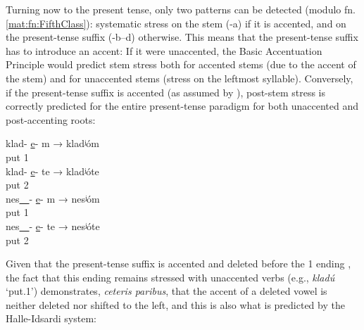 \documentclass[output=paper,colorlinks,citecolor=black,koreanfont]{langscibook}
\begin{document}
\noindent Turning now to the present tense, only two patterns can be detected (modulo fn. \ref{mat:fn:FifthClass}): systematic stress on the stem (-a) if it is accented, and on the present-tense suffix (-b--d) otherwise. This means \citep{Halle1973,Melvold1989} that the present-tense suffix has to introduce an accent: If it were unaccented, the Basic Accentuation Principle  would predict stem stress both for accented stems (due to the accent of the stem) and for unaccented stems (stress on the leftmost syllable). Conversely, if the present-tense suffix is accented (as assumed by \citealt{Melvold1989}), post-stem stress is correctly predicted for the entire present-tense paradigm for both unaccented  and post-accenting  roots:

\ea\label{mat:ex:PostStem-Unaccented}
\ea\gll klad- \ul{e}- m → kladʲóm \\
put {\PRS} {1\PL}\\
\ex\gll klad- \ul{e}- te → kladʲóte \\
put {\PRS} {2\PL}\\
\z
\ex\label{mat:ex:PostStem-Post-Accenting}
\ea\gll nes\ul{~~}- \ul{e}- m → nesʲóm \\
put {\PRS} {1\PL}\\
\ex\gll nes\ul{~~}- \ul{e}- te → nesʲóte \\
put {\PRS} {2\PL}\\
\z
\z

\noindent Given that the present-tense suffix is accented and deleted before the {1\SG} ending , the fact that this ending remains stressed with unaccented verbs (e.g., \textit{kladú} ‘put.{1\SG}’) demonstrates, \textit{ceteris paribus}, that the accent of a deleted vowel is neither deleted nor shifted to the left, and this is also what is predicted by the Halle-Idsardi system:\bigskip
\end{document}
